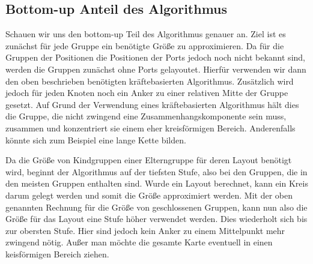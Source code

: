 \subsection{Bottom-up Anteil des Algorithmus}
Schauen wir uns den bottom-up Teil des Algorithmus genauer an. Ziel ist es zunächst für jede Gruppe ein benötigte Größe zu approximieren.
Da für die Gruppen der Positionen die Positionen der Ports jedoch noch nicht bekannt sind, werden die Gruppen zunächst ohne Ports gelayoutet.
Hierfür verwenden wir dann den oben beschrieben benötigten kräftebasierten Algorithmus. 
Zusätzlich wird jedoch für jeden Knoten noch ein Anker zu einer relativen Mitte der Gruppe gesetzt. 
Auf Grund der Verwendung eines kräftebasierten Algorithmus hält dies die Gruppe, die nicht zwingend eine Zusammenhangskomponente sein muss, zusammen 
und konzentriert sie einem eher kreisförmigen Bereich. Anderenfalls könnte sich zum Beispiel eine lange Kette bilden.

Da die Größe von Kindgruppen einer Elterngruppe für deren Layout benötigt wird, beginnt der Algorithmus auf der tiefsten Stufe,
also bei den Gruppen, die in den meisten Gruppen enthalten sind. Wurde ein Layout berechnet, kann ein Kreis darum gelegt werden und somit die Größe approximiert werden.
Mit der oben genannten Rechnung für die Größe von geschlossenen Gruppen, kann nun also die Größe für das Layout eine Stufe höher verwendet werden.
Dies wiederholt sich bis zur obersten Stufe. Hier sind jedoch kein Anker zu einem Mittelpunkt mehr zwingend nötig. 
Außer man möchte die gesamte Karte eventuell in einen keisförmigen Bereich ziehen.


